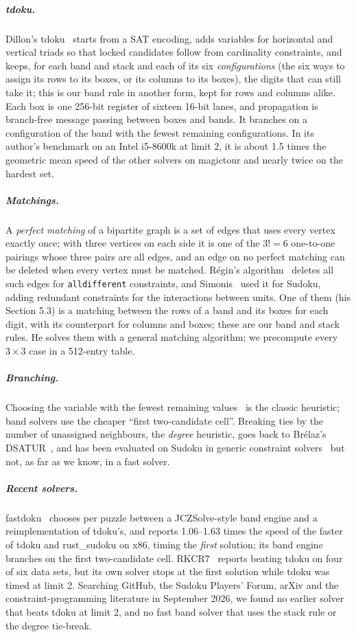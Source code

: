 \documentclass[a4paper,USenglish,cleveref,anonymous]{lipics-v2021}
\begin{document}
\subparagraph{tdoku.} Dillon's tdoku~\cite{dillon2019tdoku,dillon2019nerdsniped} starts from a SAT encoding, adds
variables for horizontal and vertical triads so that locked candidates follow from cardinality constraints, and keeps,
for each band and stack and each of its six \emph{configurations} (the six ways to assign its rows to its boxes, or its
columns to its boxes), the digits that can still take it; this is our band rule in another form, kept for rows and
columns alike. Each box is one 256-bit register of sixteen 16-bit lanes, and propagation is branch-free message passing
between boxes and bands. It branches on a configuration of the band with the fewest remaining configurations. In its
author's benchmark on an Intel i5-8600k at limit 2, it is about 1.5 times the geometric mean speed of the other solvers
on magictour and nearly twice on the hardest set.

\subparagraph{Matchings.} A \emph{perfect matching} of a bipartite graph is a set of edges that uses every vertex exactly
once; with three vertices on each side it is one of the $3!=6$ one-to-one pairings whose three pairs are all edges, and
an edge on no perfect matching can be deleted when every vertex must be matched. R\'egin's
algorithm~\cite{regin1994filtering} deletes all such edges for \texttt{alldifferent} constraints, and
Simonis~\cite{simonis2005sudoku} used it for Sudoku, adding redundant constraints for the interactions between units.
One of them (his Section 5.3) is a matching between the rows of a band and its boxes for each digit, with its
counterpart for columns and boxes; these are our band and stack rules. He solves them with a general matching
algorithm; we precompute every $3\times 3$ case in a 512-entry table.

\subparagraph{Branching.} Choosing the variable with the fewest remaining values~\cite{haralick1980increasing} is the
classic heuristic; band solvers use the cheaper ``first two-candidate cell''. Breaking ties by the number of unassigned
neighbours, the \emph{degree} heuristic, goes back to Br\'elaz's DSATUR~\cite{brelaz1979new}, and has been evaluated on
Sudoku in generic constraint solvers~\cite{bakker2015generic,liu2026dibs} but not, as far as we know, in a fast solver.

\subparagraph{Recent solvers.} fastdoku~\cite{rocketbombs2026fastdoku} chooses per puzzle between a JCZSolve-style band
engine and a reimplementation of tdoku's, and reports 1.06--1.63 times the speed of the faster of tdoku and
rust\_sudoku on x86, timing the \emph{first} solution; its band engine branches on the first two-candidate cell.
RKCR7~\cite{rkcr7_2026autoresearch} reports beating tdoku on four of six data sets, but its own solver stops at the
first solution while tdoku was timed at limit 2. Searching GitHub, the Sudoku Players' Forum, arXiv and the
constraint-programming literature in September 2026, we found no earlier solver that beats tdoku at limit 2, and no
fast band solver that uses the stack rule or the degree tie-break.
\end{document}

